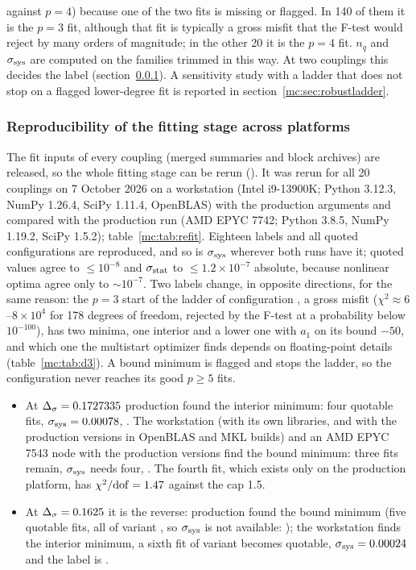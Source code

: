 \begin{description}[leftmargin=1.2em]
 against $p=4$) because one of the two fits is missing or flagged. In 140 of them it is the $p=3$ fit, although that fit is typically a gross
 misfit that the F-test would reject by many orders of magnitude; in the other 20 it is the $p=4$ fit. $n_q$ and $\sigma_{\rm sys}$ are computed on the
 families trimmed in this way. At two couplings this decides the label (section~\ref{mc:sec:1drefit}). A sensitivity study with a ladder
 that does not stop on a flagged lower-degree fit is reported in section~\ref{mc:sec:robustladder}.
\end{description}

\subsubsection{Reproducibility of the fitting stage across platforms}\label{mc:sec:1drefit}
The fit inputs of every coupling (merged summaries and block archives) are released, so the whole fitting stage can be rerun
(). It was rerun for all 20 couplings on 7 October 2026 on a workstation (Intel i9-13900K; Python 3.12.3, NumPy 1.26.4,
SciPy 1.11.4, OpenBLAS) with the production arguments and compared with the production run (AMD EPYC 7742; Python 3.8.5, NumPy 1.19.2, SciPy
1.5.2); table~\ref{mc:tab:refit}. Eighteen labels and all quoted configurations are reproduced, and so is $\sigma_{\rm sys}$ wherever both runs have it;
quoted values agree to $\le10^{-8}$ and $\sigma_{\rm stat}$ to $\le1.2\times10^{-7}$ absolute, because nonlinear optima agree only to $\sim10^{-7}$. Two
labels change, in opposite directions, for the same reason: the $p=3$ start of the ladder of configuration ,
a gross misfit ($\chi^2\approx6$--$8\times10^4$ for 178 degrees of freedom, rejected by the F-test at a probability below $10^{-100}$), has two minima, one
interior and a lower one with $a_1$ on its bound $-50$, and which one the multistart optimizer finds depends on floating-point details
(table~\ref{mc:tab:d3}). A bound minimum is flagged and stops the ladder, so the configuration never reaches its good $p\ge5$ fits.
\begin{itemize}
\item At $\Delta_\sigma=0.1727335$ production found the interior minimum: four quotable fits, $\sigma_{\rm sys}=0.00078$, . The workstation (with its
 own libraries, and with the production versions in OpenBLAS and MKL builds) and an AMD EPYC 7543 node with the production versions find the
 bound minimum: three fits remain, $\sigma_{\rm sys}$ needs four, . The fourth fit, which exists only on the production platform, has
 $\chi^2/{\rm dof}=1.47$ against the cap 1.5.
\item At $\Delta_\sigma=0.1625$ it is the reverse: production found the bound minimum (five quotable fits, all of variant , so $\sigma_{\rm sys}$ is not
 available: ); the workstation finds the interior minimum, a sixth fit of variant  becomes quotable, $\sigma_{\rm sys}=0.00024$
 and the label is .
\end{itemize}
